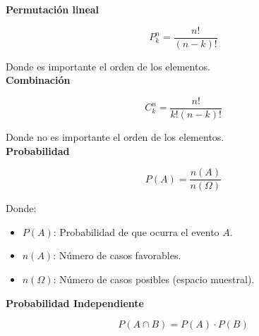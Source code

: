 \documentclass[11pt, a4paper]{article}
\newenvironment{tecnicasDeConteo}{}{}
\newenvironment{probabilidad}{}{}
\newenvironment{probabilidadIndependiente}{}{}
\begin{document}
    \begin{multicols}{2}
        \begin{tecnicasDeConteo}
            \textbf{Permutación lineal}
            \hrulefill
            \begin{center}
                \begin{equation*}
                    P^n_k = \dfrac{n!}{(n-k)!}
                \end{equation*}
            \end{center}
            Donde es importante el orden de los elementos.\\
            \textbf{Combinación}
            \hrulefill
            \begin{center}
                \begin{equation*}
                    C^n_k = \dfrac{n!}{k!(n-k)!}
                \end{equation*}
            \end{center}
            Donde no es importante el orden de los elementos.\\
        \end{tecnicasDeConteo}
        \begin{probabilidad}
            \textbf{Probabilidad}
            \hrulefill
            \begin{center}
                \begin{equation*}
                    P(A) = \dfrac{n(A)}{n(\Omega)}
                \end{equation*}
            \end{center}
            Donde:
            \begin{itemize}
                \item $P(A)$: Probabilidad de que ocurra el evento $A$.
                \item $n(A)$: Número de casos favorables.
                \item $n(\Omega)$: Número de casos posibles (espacio muestral).
            \end{itemize}
        \end{probabilidad}
        \begin{probabilidadIndependiente}
            \textbf{Probabilidad Independiente}
            \hrulefill
            \begin{center}
                \begin{equation*}
                    P(A \cap B) = P(A) \cdot P(B)
                \end{equation*}

\end{center}
\end{probabilidadIndependiente}
\end{multicols}
\end{document}
